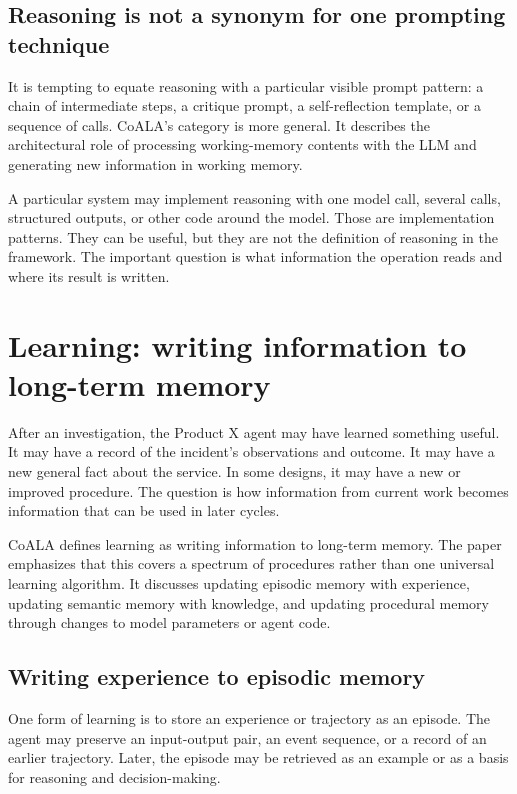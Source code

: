 \subsection{Reasoning is not a synonym for one prompting technique}

It is tempting to equate reasoning with a particular visible prompt pattern: a chain of intermediate steps, a critique prompt, a self-reflection template, or a sequence of calls. CoALA's category is more general. It describes the architectural role of processing working-memory contents with the LLM and generating new information in working memory.

A particular system may implement reasoning with one model call, several calls, structured outputs, or other code around the model. Those are implementation patterns. They can be useful, but they are not the definition of reasoning in the framework. The important question is what information the operation reads and where its result is written.

\section{Learning: writing information to long-term memory}
\label{sec:learning}

After an investigation, the Product X agent may have learned something useful. It may have a record of the incident's observations and outcome. It may have a new general fact about the service. In some designs, it may have a new or improved procedure. The question is how information from current work becomes information that can be used in later cycles.

CoALA defines learning as writing information to long-term memory. The paper emphasizes that this covers a spectrum of procedures rather than one universal learning algorithm. It discusses updating episodic memory with experience, updating semantic memory with knowledge, and updating procedural memory through changes to model parameters or agent code.

\subsection{Writing experience to episodic memory}

One form of learning is to store an experience or trajectory as an episode. The agent may preserve an input-output pair, an event sequence, or a record of an earlier trajectory. Later, the episode may be retrieved as an example or as a basis for reasoning and decision-making.

